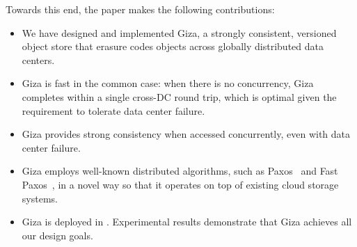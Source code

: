 Towards this end, the paper makes the following contributions:
\begin{itemize}
    \item We have designed and implemented Giza, a strongly consistent,
      versioned object store that erasure codes objects across globally
      distributed data centers.
    \item Giza is fast in the common case: when there is no concurrency, Giza
      completes within a single cross-DC round trip, which is optimal given the
      requirement to tolerate data center failure.
    \item Giza provides strong consistency when accessed concurrently, even with data center
      failure.
    \item Giza employs well-known distributed algorithms, such as Paxos~\cite{lamport01paxos}
      and Fast Paxos~\cite{lamport05fast}, in a novel way so that it operates on top of existing cloud storage
      systems.
    \item Giza is deployed in \deployment. Experimental results demonstrate
      that Giza achieves all our design goals. %
\end{itemize}
